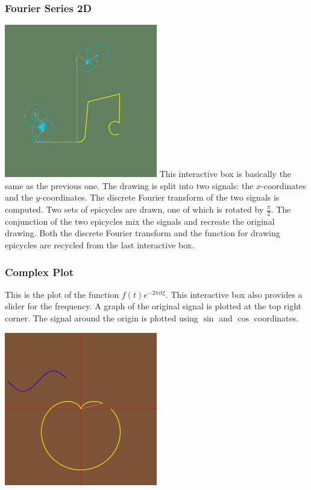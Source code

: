 \documentclass{article}
\begin{document}
\subsubsection{Fourier Series 2D}

\begin{multicols}{2}
    \includegraphics[width=0.5\textwidth]{fourierseries2d.png}
    This interactive box is basically the same as the previous one.
    The drawing is split into two signals: the \(x\)-coordinates and the \(y\)-coordinates.
    The discrete Fourier transform of the two signals is computed.
    Two sets of epicycles are drawn, one of which is rotated by \(\frac{\pi}{2}\).
    The conjunction of the two epicycles mix the signals and recreate the original drawing.
    Both the discrete Fourier transform and the function for drawing
    epicycles are recycled from the last interactive box.
\end{multicols}

\pagebreak

\subsubsection{Complex Plot}

\begin{multicols}{2}
    This is the plot of the function \(f(t)e^{-2\pi it\xi}\).
    This interactive box also provides a slider for the frequency.
    A graph of the original signal is plotted at the top right corner.
    The signal around the origin is plotted using \(\sin\) and \(\cos\) coordinates.

    \includegraphics[width=0.5\textwidth]{complexplot.png}
\end{multicols}
\end{document}

